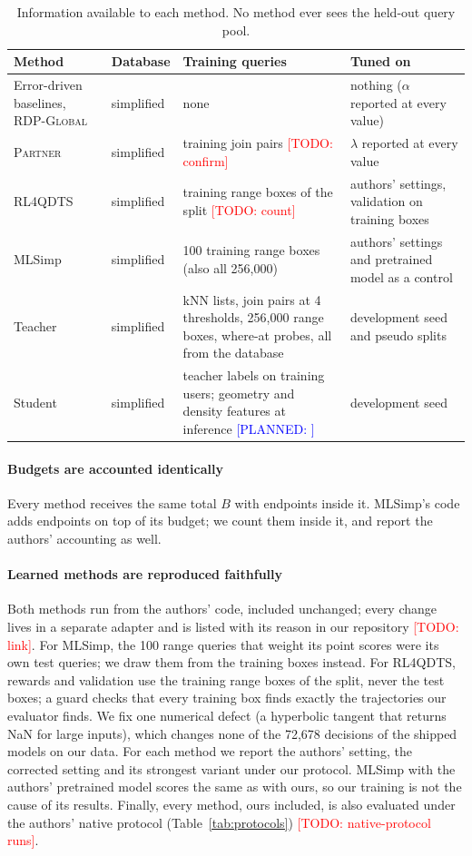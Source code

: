 \documentclass[conference]{IEEEtran}
\newcommand{\todo}[1]{\textcolor{red}{[TODO: #1]}}
\newcommand{\planned}[1]{\textcolor{blue}{[PLANNED: #1]}}
\begin{document}
\begin{table}[t]
\centering
\caption{Information available to each method. No method ever sees the held-out query pool.}
\label{tab:access}
\small
\begin{tabular}{@{}p{3.3cm}p{2.6cm}p{6.2cm}p{4.0cm}@{}}
\toprule
Method & Database & Training queries & Tuned on \\
\midrule
Error-driven baselines, \textsc{RDP-Global} & simplified & none & nothing ($\alpha$ reported at every value) \\
\textsc{Partner} & simplified & training join pairs \todo{confirm} & $\lambda$ reported at every value \\
RL4QDTS & simplified & training range boxes of the split \todo{count} & authors' settings, validation on training boxes \\
MLSimp & simplified & 100 training range boxes (also all 256{,}000) & authors' settings and pretrained model as a control \\
Teacher & simplified & kNN lists, join pairs at 4 thresholds, 256{,}000 range boxes, where-at probes, all from the database & development seed and pseudo splits \\
Student & simplified & teacher labels on training users; geometry and density features at inference \planned{} & development seed \\
\bottomrule
\end{tabular}
\end{table}

\paragraph{Budgets are accounted identically}
Every method receives the same total $B$ with endpoints inside it. MLSimp's code adds endpoints on
top of its budget; we count them inside it, and report the authors' accounting as well.

\paragraph{Learned methods are reproduced faithfully}
\label{sec:reproduction}
Both methods run from the authors' code, included unchanged; every change lives in a separate
adapter and is listed with its reason in our repository \todo{link}. For MLSimp, the 100 range
queries that weight its point scores were its own test queries; we draw them from the training
boxes instead. For RL4QDTS, rewards and validation use the training range boxes of the split, never
the test boxes; a guard checks that every training box finds exactly the trajectories our
evaluator finds. We fix one numerical defect (a hyperbolic tangent that returns NaN for large
inputs), which changes none of the 72{,}678 decisions of the shipped models on our data. For each
method we report the authors' setting, the corrected setting and its strongest variant under our
protocol. MLSimp with the authors' pretrained model scores the same as with ours, so our training
is not the cause of its results. Finally, every method, ours included, is also evaluated under the
authors' native protocol (Table~\ref{tab:protocols}) \todo{native-protocol runs}.
\end{document}
